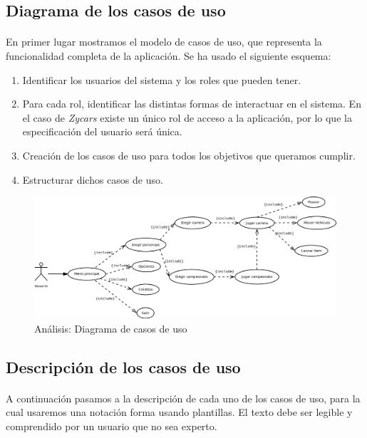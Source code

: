 \subsection{Diagrama de los casos de uso}

\paragraph{}
En primer lugar mostramos el modelo de casos de uso, que representa la funcionalidad completa de la aplicación. Se ha usado el 
siguiente esquema:

\begin{enumerate}
    \item Identificar los usuarios del sistema y los roles que pueden tener.
    \item Para cada rol, identificar las distintas formas de interactuar en el sistema. En el caso de \emph{Zycars} existe
    un único rol de acceso a la aplicación, por lo que la especificación del usuario será única.
    \item Creación de los casos de uso para todos los objetivos que queramos cumplir.
    \item Estructurar dichos casos de uso.
\end{enumerate}

\begin{figure}[H]
  \label{diagrama_casos_uso}
  \begin{flushleft}
    \includegraphics[scale=0.45]{imagenes/analisis/diagrama_casos.png}
  \end{flushleft}
  \caption{Análisis: Diagrama de casos de uso}
\end{figure}

\subsection{Descripción de los casos de uso}

\paragraph{}
A continuación pasamos a la descripción de cada uno de los casos de uso, para la cual usaremos una notación forma usando plantillas.
El texto debe ser legible y comprendido por un usuario que no sea experto.

